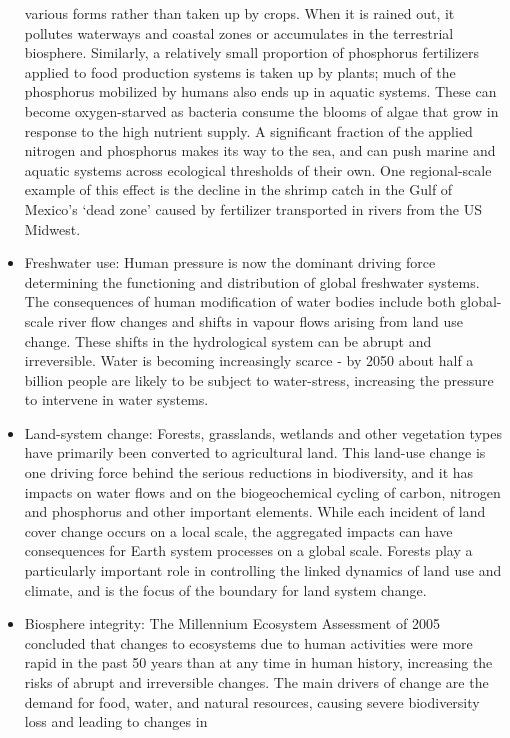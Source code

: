 \documentclass[12pt,oneside]{book}
\begin{document}
\begin{itemize}
  various forms rather than taken up by crops. When it is rained out, it
  pollutes waterways and coastal zones or accumulates in the terrestrial
  biosphere. Similarly, a relatively small proportion of phosphorus
  fertilizers applied to food production systems is taken up by plants;
  much of the phosphorus mobilized by humans also ends up in aquatic
  systems. These can become oxygen-starved as bacteria consume the
  blooms of algae that grow in response to the high nutrient supply. A
  significant fraction of the applied nitrogen and phosphorus makes its
  way to the sea, and can push marine and aquatic systems across
  ecological thresholds of their own. One regional-scale example of this
  effect is the decline in the shrimp catch in the Gulf of Mexico's
  `dead zone' caused by fertilizer transported in rivers from the US
  Midwest.
\item
  Freshwater use: Human pressure is now the dominant driving force
  determining the functioning and distribution of global freshwater
  systems. The consequences of human modification of water bodies
  include both global-scale river flow changes and shifts in vapour
  flows arising from land use change. These shifts in the hydrological
  system can be abrupt and irreversible. Water is becoming increasingly
  scarce - by 2050 about half a billion people are likely to be subject
  to water-stress, increasing the pressure to intervene in water
  systems.
\item
  Land-system change: Forests, grasslands, wetlands and other vegetation
  types have primarily been converted to agricultural land. This
  land-use change is one driving force behind the serious reductions in
  biodiversity, and it has impacts on water flows and on the
  biogeochemical cycling of carbon, nitrogen and phosphorus and other
  important elements. While each incident of land cover change occurs on
  a local scale, the aggregated impacts can have consequences for Earth
  system processes on a global scale. Forests play a particularly
  important role in controlling the linked dynamics of land use and
  climate, and is the focus of the boundary for land system change.
\item
  Biosphere integrity: The Millennium Ecosystem Assessment of 2005
  concluded that changes to ecosystems due to human activities were more
  rapid in the past 50 years than at any time in human history,
  increasing the risks of abrupt and irreversible changes. The main
  drivers of change are the demand for food, water, and natural
  resources, causing severe biodiversity loss and leading to changes in

\end{itemize}
\end{document}
